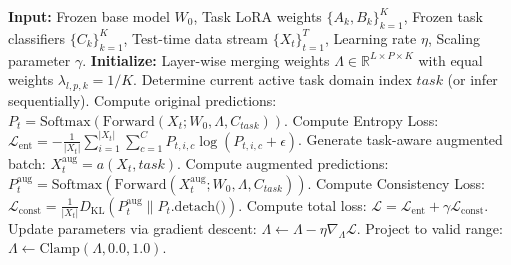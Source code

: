 \documentclass{article}
\theoremstyle{plain}
\theoremstyle{definition}
\theoremstyle{remark}
\begin{document}
\begin{algorithm}[h]
\caption{S2C-Merge: Teacher-Free Test-Time Model Merging}
\label{alg:s2c_merge}
\begin{algorithmic}[1]
\STATE \textbf{Input:} Frozen base model $W_0$, Task LoRA weights $\{A_k, B_k\}_{k=1}^K$, Frozen task classifiers $\{C_k\}_{k=1}^K$, Test-time data stream $\{X_t\}_{t=1}^T$, Learning rate $\eta$, Scaling parameter $\gamma$.
\STATE \textbf{Initialize:} Layer-wise merging weights $\Lambda \in \mathbb{R}^{L \times P \times K}$ with equal weights $\lambda_{l, p, k} = 1/K$.
    \STATE Determine current active task domain index $task$ (or infer sequentially).
    \STATE Compute original predictions: $P_t = \text{Softmax}(\text{Forward}(X_t; W_0, \Lambda, C_{task}))$.
    \STATE Compute Entropy Loss: $\mathcal{L}_{\text{ent}} = - \frac{1}{|X_t|} \sum_{i=1}^{|X_t|} \sum_{c=1}^C P_{t, i, c} \log(P_{t, i, c} + \epsilon)$.
    \STATE Generate task-aware augmented batch: $X^{\text{aug}}_t = a(X_t, task)$.
    \STATE Compute augmented predictions: $P^{\text{aug}}_t = \text{Softmax}(\text{Forward}(X^{\text{aug}}_t; W_0, \Lambda, C_{task}))$.
    \STATE Compute Consistency Loss: $\mathcal{L}_{\text{const}} = \frac{1}{|X_t|} D_{\text{KL}}(P^{\text{aug}}_t \parallel P_t.\text{detach()})$.
    \STATE Compute total loss: $\mathcal{L} = \mathcal{L}_{\text{ent}} + \gamma \mathcal{L}_{\text{const}}$.
    \STATE Update parameters via gradient descent: $\Lambda \leftarrow \Lambda - \eta \nabla_{\Lambda} \mathcal{L}$.
    \STATE Project to valid range: $\Lambda \leftarrow \text{Clamp}(\Lambda, 0.0, 1.0)$.
\ENDFOR
\end{algorithmic}
\end{algorithm}
\end{document}
